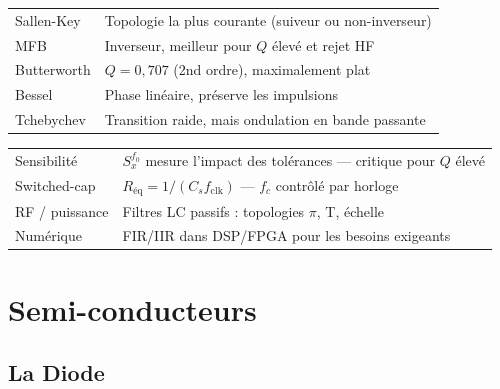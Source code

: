 \documentclass[12pt,a4paper,twoside]{book}
\begin{document}
\begin{approfondissement}[title={\color{white} Résumé --- Approfondissement}]
\begin{center}
\renewcommand{\arraystretch}{1.3}
\begin{tabular}{p{4cm}p{9cm}}
\toprule
Sallen-Key & Topologie la plus courante (suiveur ou non-inverseur) \\
MFB & Inverseur, meilleur pour $Q$ élevé et rejet HF \\
Butterworth & $Q = 0{,}707$ (2nd ordre), maximalement plat \\
Bessel & Phase linéaire, préserve les impulsions \\
Tchebychev & Transition raide, mais ondulation en bande passante \\
\bottomrule
\end{tabular}
\end{center}
\end{approfondissement}

\begin{ingenieur}[title={\color{white} Résumé --- Niveau Ingénieur}]
\begin{center}
\renewcommand{\arraystretch}{1.3}
\begin{tabular}{p{4cm}p{9cm}}
\toprule
Sensibilité & $S_x^{f_0}$ mesure l'impact des tolérances --- critique pour $Q$ élevé \\
Switched-cap & $R_{\text{éq}} = 1/(C_s f_{\text{clk}})$ --- $f_c$ contrôlé par horloge \\
RF / puissance & Filtres LC passifs : topologies $\pi$, T, échelle \\
Numérique & FIR/IIR dans DSP/FPGA pour les besoins exigeants \\
\bottomrule
\end{tabular}
\end{center}
\end{ingenieur}


\part{Semi-conducteurs}

\chapter{La Diode}
\end{document}
